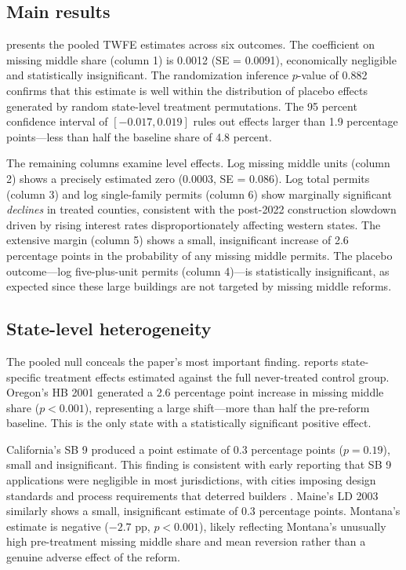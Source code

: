 \documentclass[12pt]{article}
\begin{document}
\subsection{Main results}

 presents the pooled TWFE estimates across six outcomes. The coefficient on missing middle share (column 1) is 0.0012 (SE = 0.0091), economically negligible and statistically insignificant. The randomization inference $p$-value of 0.882 confirms that this estimate is well within the distribution of placebo effects generated by random state-level treatment permutations. The 95 percent confidence interval of $[-0.017, 0.019]$ rules out effects larger than 1.9 percentage points---less than half the baseline share of 4.8 percent.

The remaining columns examine level effects. Log missing middle units (column 2) shows a precisely estimated zero (0.0003, SE = 0.086). Log total permits (column 3) and log single-family permits (column 6) show marginally significant \textit{declines} in treated counties, consistent with the post-2022 construction slowdown driven by rising interest rates disproportionately affecting western states. The extensive margin (column 5) shows a small, insignificant increase of 2.6 percentage points in the probability of any missing middle permits. The placebo outcome---log five-plus-unit permits (column 4)---is statistically insignificant, as expected since these large buildings are not targeted by missing middle reforms.



\subsection{State-level heterogeneity}

The pooled null conceals the paper's most important finding.  reports state-specific treatment effects estimated against the full never-treated control group. Oregon's HB 2001 generated a 2.6 percentage point increase in missing middle share ($p < 0.001$), representing a large shift---more than half the pre-reform baseline. This is the only state with a statistically significant positive effect.

California's SB 9 produced a point estimate of 0.3 percentage points ($p = 0.19$), small and insignificant. This finding is consistent with early reporting that SB 9 applications were negligible in most jurisdictions, with cities imposing design standards and process requirements that deterred builders \citep{Murray2022}. Maine's LD 2003 similarly shows a small, insignificant estimate of 0.3 percentage points. Montana's estimate is negative ($-2.7$ pp, $p < 0.001$), likely reflecting Montana's unusually high pre-treatment missing middle share and mean reversion rather than a genuine adverse effect of the reform.
\end{document}
